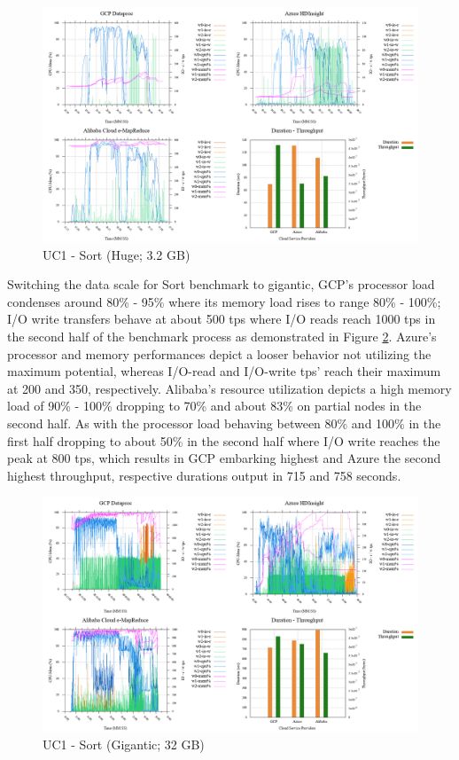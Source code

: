 \documentclass[review]{elsarticle}
\begin{document}
\begin{figure}[p]
	\caption{UC1 - Sort (Huge; 3.2 GB)}
	\label{fig:uc1-srt-h-cmidt}
	\includegraphics[width=\textwidth]{uc1-srt-h-cmidt}
	\centering
\end{figure}


Switching the data scale for Sort benchmark to gigantic, GCP's processor load condenses around 80\% - 95\% where its memory load rises to range 80\% - 100\%; I/O write transfers behave at about 500 tps where I/O reads reach 1000 tps in the second half of the benchmark process as demonstrated in Figure \ref{fig:uc1-srt-g-cmidt}. Azure's processor and memory performances depict a looser behavior not utilizing the maximum potential, whereas I/O-read and I/O-write tps' reach their maximum at 200 and 350, respectively. Alibaba's resource utilization depicts a high memory load of 90\% - 100\% dropping to 70\% and about 83\% on partial nodes in the second half. As with the processor load behaving between 80\% and 100\% in the first half dropping to about 50\% in the second half where I/O write reaches the peak at 800 tps, which results in GCP embarking highest and Azure the second highest throughput, respective durations output in 715 and 758 seconds.

\begin{figure}[p]
	\caption{UC1 - Sort (Gigantic; 32 GB)}
	\label{fig:uc1-srt-g-cmidt}
	\includegraphics[width=\textwidth]{uc1-srt-g-cmidt}
	\centering
\end{figure}
\end{document}
